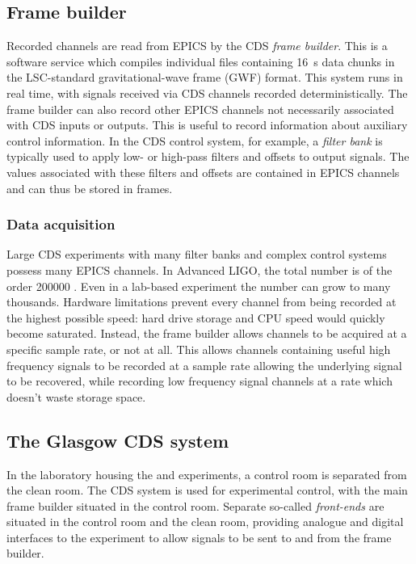 \subsection{Frame builder}
Recorded channels are read from \gls{EPICS} by the \gls{CDS} \emph{frame builder}. This is a software service which compiles individual files containing \SI{16}{\second} data chunks in the \gls{LSC}-standard gravitational-wave frame (\gls{GWF}) format. This system runs in real time, with signals received via \gls{CDS} channels recorded deterministically. The frame builder can also record other EPICS channels not necessarily associated with \gls{CDS} inputs or outputs. This is useful to record information about auxiliary control information. In the \gls{CDS} control system, for example, a \emph{filter bank} is typically used to apply low- or high-pass filters and offsets to output signals. The values associated with these filters and offsets are contained in EPICS channels and can thus be stored in frames.

\subsubsection{Data acquisition}
Large \gls{CDS} experiments with many filter banks and complex control systems possess many \gls{EPICS} channels. In Advanced LIGO, the total number is of the order \num{200000} \cite{aligonoise2016}. Even in a lab-based experiment the number can grow to many thousands. Hardware limitations prevent every channel from being recorded at the highest possible speed: hard drive storage and \gls{CPU} speed would quickly become saturated. Instead, the frame builder allows channels to be acquired at a specific sample rate, or not at all. This allows channels containing useful high frequency signals to be recorded at a sample rate allowing the underlying signal to be recovered, while recording low frequency signal channels at a rate which doesn't waste storage space.

\subsection{The Glasgow CDS system}
In the laboratory housing the \GLASGOWTENM{} and \SSM{} experiments, a control room is separated from the clean room. The \gls{CDS} system is used for experimental control, with the main frame builder situated in the control room. Separate so-called \emph{front-ends} are situated in the control room and the clean room, providing analogue and digital interfaces to the experiment to allow signals to be sent to and from the frame builder.

